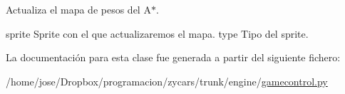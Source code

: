 \-Actualiza el mapa de pesos del \-A$\ast$. 

sprite \-Sprite con el que actualizaremos el mapa. type \-Tipo del sprite. 

\-La documentación para esta clase fue generada a partir del siguiente fichero\-:\begin{DoxyCompactItemize}
\item 
/home/jose/\-Dropbox/programacion/zycars/trunk/engine/\hyperlink{gamecontrol_8py}{gamecontrol.\-py}\end{DoxyCompactItemize}
